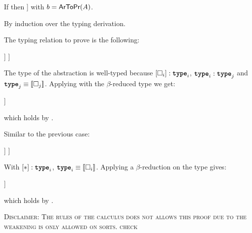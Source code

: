 \begin{Theorem}
\label{theorem:typingSoundness}
If  then 
\ctyping[][\WContextTrans[b]{\Context}]{}{} with 
$b=\propFun[A]$.
\end{Theorem}

\begin{Proof}
By induction over the typing derivation.
\begin{ProofCase}{\CicType}
The typing relation to prove is the following:
\begin{center}
\ctyping[][\WContextTrans[\False]{\Context}]{\WParamTrans{\Type}}{\app{\WParamTypeTrans{\Type[j]}}{\Trans{\Type}}}
\termEq{}
\ctyping[][\WContextTrans[\False]{\Context}]{%
    }{%
    }
\end{center}
The type of the abstraction is well-typed because $\Trans{\Type}:\type$, $\type:\type[j]$ and 
$\type[j]\equiv\TypeTrans{\Type[j]}$. Applying \CicConv with the $\beta$-reduced type we get:
\begin{center}
\ctyping[][\WContextTrans[\False]{\Context}]{%
    }{%
    \arrow{\TypeTrans{\Type}}{\Type[j]}
    }
\end{center}
which holds by \CicAbs.
\end{ProofCase}

\begin{ProofCase}{\CicProp}
Similar to the previous case:
\begin{center}
\ctyping[][\WContextTrans[\True]{\Context}]{\WParamTrans{\Prop}}{\app{\WParamTypeTrans{\Type[j]}}{\Trans{\Prop}}}
\termEq{} 
\ctyping[][\WContextTrans[\True]{\Context}]{%
    }{%
    }
\end{center}
With $\Trans{\Prop{}}:\type$, $\type\equiv\TypeTrans{\Type}$. Applying a $\beta$-reduction on the type gives:
\begin{center}
\ctyping[][\WContextTrans[\True]{\Context}]{%
    }{%
    \arrow{\TypeTrans{\Prop}}{\Type}
    }
\end{center}
which holds by \CicAbs.
\end{ProofCase}

\begin{WarningProofCase}{\CicWeak}
\textsc{Disclaimer: The rules of the calculus does not allows this proof due to the weakening is
only allowed on sorts. check}


\end{WarningProofCase}
\end{Proof}
